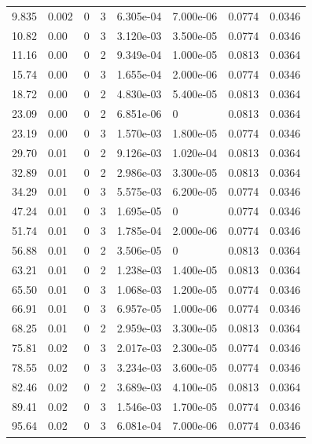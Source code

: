 \documentclass[preview]{standalone}
\begin{document}
{{\begin{tabular}{L{1.2cm}C{1.2cm} C{0.3cm}C{0.5cm} C{1.4cm}C{1.4cm} C{1.4cm}C{1.4cm}}
  9.835  &  0.002  & 0     &  3 &  6.305e-04  & 7.000e-06  & 0.0774 &  0.0346   \\ 
  10.82  &  0.00  & 0     &  3 &  3.120e-03  & 3.500e-05  & 0.0774 &  0.0346   \\ 
  11.16  &  0.00  & 0     &  2 &  9.349e-04  & 1.000e-05  & 0.0813 &  0.0364   \\ 
  15.74  &  0.00  & 0     &  3 &  1.655e-04  & 2.000e-06  & 0.0774 &  0.0346   \\ 
  18.72  &  0.00  & 0     &  2 &  4.830e-03  & 5.400e-05  & 0.0813 &  0.0364   \\ 
  23.09  &  0.00  & 0     &  2 &  6.851e-06  & 0  & 0.0813 &  0.0364   \\ 
  23.19  &  0.00  & 0     &  3 &  1.570e-03  & 1.800e-05  & 0.0774 &  0.0346   \\ 
  29.70  &  0.01  & 0     &  2 &  9.126e-03  & 1.020e-04  & 0.0813 &  0.0364   \\ 
  32.89  &  0.01  & 0     &  2 &  2.986e-03  & 3.300e-05  & 0.0813 &  0.0364   \\ 
  34.29  &  0.01  & 0     &  3 &  5.575e-03  & 6.200e-05  & 0.0774 &  0.0346   \\ 
  47.24  &  0.01  & 0     &  3 &  1.695e-05  & 0  & 0.0774 &  0.0346   \\ 
  51.74  &  0.01  & 0     &  3 &  1.785e-04  & 2.000e-06  & 0.0774 &  0.0346   \\ 
  56.88  &  0.01  & 0     &  2 &  3.506e-05  & 0  & 0.0813 &  0.0364   \\ 
  63.21  &  0.01  & 0     &  2 &  1.238e-03  & 1.400e-05  & 0.0813 &  0.0364   \\ 
  65.50  &  0.01  & 0     &  3 &  1.068e-03  & 1.200e-05  & 0.0774 &  0.0346   \\ 
  66.91  &  0.01  & 0     &  3 &  6.957e-05  & 1.000e-06  & 0.0774 &  0.0346   \\ 
  68.25  &  0.01  & 0     &  2 &  2.959e-03  & 3.300e-05  & 0.0813 &  0.0364   \\ 
  75.81  &  0.02  & 0     &  3 &  2.017e-03  & 2.300e-05  & 0.0774 &  0.0346   \\ 
  78.55  &  0.02  & 0     &  3 &  3.234e-03  & 3.600e-05  & 0.0774 &  0.0346   \\ 
  82.46  &  0.02  & 0     &  2 &  3.689e-03  & 4.100e-05  & 0.0813 &  0.0364   \\ 
  89.41  &  0.02  & 0     &  3 &  1.546e-03  & 1.700e-05  & 0.0774 &  0.0346   \\ 
  95.64  &  0.02  & 0     &  3 &  6.081e-04  & 7.000e-06  & 0.0774 &  0.0346   \\ 

\end{tabular}}}
\end{document}
